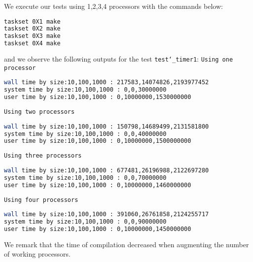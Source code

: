 \documentclass[11pt]{article}
\begin{document}
We execute our tests using 1,2,3,4 processors with the commands below:
\begin{lstlisting}[language={sh}]
taskset 0X1 make
taskset 0X2 make
taskset 0X3 make
taskset 0X4 make
\end{lstlisting}
 and we observe the following outputs for the test \texttt{test\char`_timer1}:
\texttt{Using one processor}
\begin{lstlisting}[language={sh}]
wall time by size:10,100,1000 : 217583,14074826,2193977452
system time by size:10,100,1000 : 0,0,30000000
user time by size:10,100,1000 : 0,10000000,1530000000
\end{lstlisting}
\texttt{Using two processors}
\begin{lstlisting}[language={sh}]
wall time by size:10,100,1000 : 150798,14689499,2131581800
system time by size:10,100,1000 : 0,0,40000000
user time by size:10,100,1000 : 0,10000000,1500000000
\end{lstlisting}
\texttt{Using three processors}
\begin{lstlisting}[language={sh}]
wall time by size:10,100,1000 : 677481,26196988,2122697280
system time by size:10,100,1000 : 0,0,70000000
user time by size:10,100,1000 : 0,10000000,1460000000
\end{lstlisting}
\texttt{Using four processors}
\begin{lstlisting}[language={sh}]
wall time by size:10,100,1000 : 391060,26761858,2124255717
system time by size:10,100,1000 : 0,0,90000000
user time by size:10,100,1000 : 0,10000000,1450000000
\end{lstlisting}

We remark that the time of compilation decreased when augmenting the number of working processors.
\end{document}
